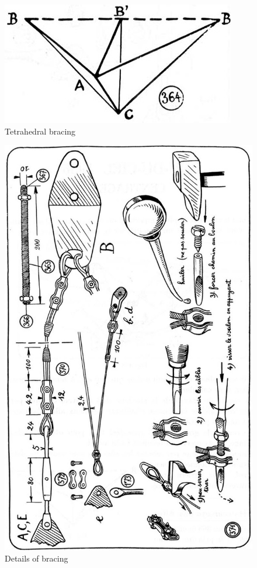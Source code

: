 \documentclass{book}
\begin{document}
\begin{figure}
  \includegraphics[width=\linewidth]{fig-79.jpg}
  \caption{Tetrahedral bracing}
  \label{fig:seventynine}
\end{figure}

\begin{figure}
  \includegraphics[width=\linewidth]{fig-80.jpg}
  \caption{Details of bracing}
  \label{fig:eighty}
\end{figure}
\end{document}
